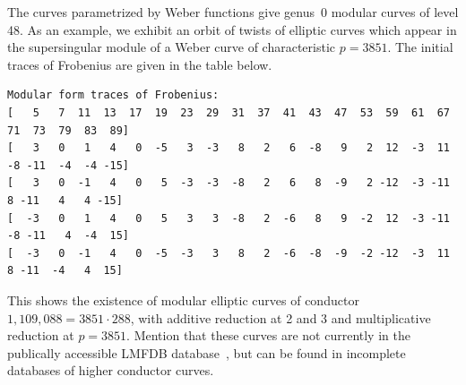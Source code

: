 \documentclass{amsart}
\begin{document}
\bigskip

The curves parametrized by Weber functions give genus~$0$ modular curves
of level 48.  As an example, we exhibit an orbit of twists of elliptic
curves which appear in the supersingular module of a Weber curve of
characteristic $p = 3851$.  The initial traces of Frobenius are given
in the table below.

\noindent
\begin{minipage}{0.75\textwidth}
{\small
\begin{verbatim}
Modular form traces of Frobenius:
[   5   7  11  13  17  19  23  29  31  37  41  43  47  53  59  61  67  71  73  79  83  89]
[   3   0   1   4   0  -5   3  -3   8   2   6  -8   9   2  12  -3  11  -8 -11  -4  -4 -15]
[   3   0  -1   4   0   5  -3  -3  -8   2   6   8  -9   2 -12  -3 -11   8 -11   4   4 -15]
[  -3   0   1   4   0   5   3   3  -8   2  -6   8   9  -2  12  -3 -11  -8 -11   4  -4  15]
[  -3   0  -1   4   0  -5  -3   3   8   2  -6  -8  -9  -2 -12  -3  11   8 -11  -4   4  15]
\end{verbatim}
}
\end{minipage}
\bigskip

\noindent
This shows the existence of modular elliptic curves of conductor $1,109,088 = 3851 \cdot 288$,
with additive reduction at 2 and 3 and multiplicative reduction at $p = 3851$.
Mention that these curves are not currently in the publically accessible LMFDB database~\cite{LMFDB},
but can be found in incomplete databases of higher conductor curves.

\end{document}
